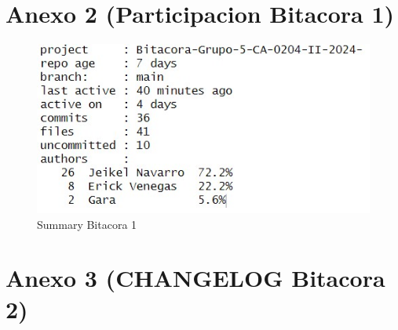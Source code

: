 \documentclass[
  letterpaper,
  DIV=11,
  numbers=noendperiod]{scrreprt}
\begin{document}
\section{Anexo 2 (Participacion Bitacora
1)}\label{anexo-2-participacion-bitacora-1}

\begin{figure}[H]

{\centering \includegraphics{imagenes/summary_1.jpeg}

}

\caption{Summary Bitacora 1}

\end{figure}%

\section{Anexo 3 (CHANGELOG Bitacora
2)}\label{anexo-3-changelog-bitacora-2}
\end{document}
